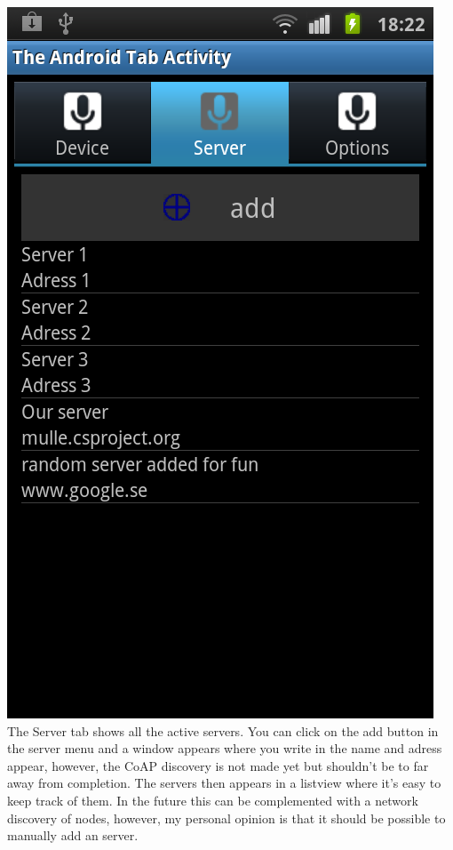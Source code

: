  \includegraphics[scale=0.50]{android-server.png}%
\\The Server tab shows all the active servers. You can click on the add button in the server menu and a window appears where you write in the name and adress appear, 
however, the CoAP discovery is not made yet but shouldn't be to far away from completion. The servers then appears in a listview where it's easy to keep track of them.
In the future this can be complemented with a network discovery of nodes, however, my personal opinion is that it should be possible to manually add an server.

